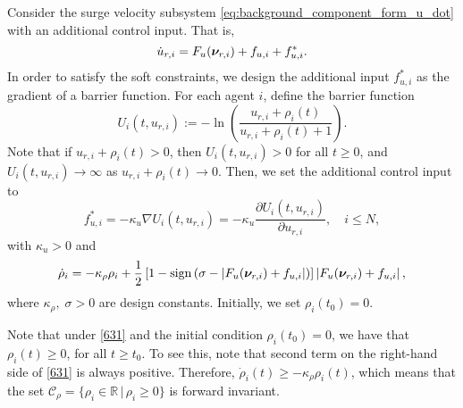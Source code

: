 Consider the surge velocity subsystem \eqref{eq:background_component_form_u_dot} with an additional control input. That is,
\begin{equation}\label{622}
	\dot{u}_{r, i} = F_{u}(\bm{\nu}_{r, i}) + f_{u, i} + f_{u, i}^*.
\end{equation}
In order to satisfy the soft constraints, we design the additional input $f_{u, i}^*$ as the gradient of a barrier function.
For each agent $i$, define the barrier function 
\begin{equation}\label{628}
	U_i(t,u_{r, i}):=-\ln\left(\frac{u_{r, i} + \rho_i(t)}{u_{r, i} + \rho_i(t) +1}\right).
\end{equation}
Note that if $u_{r, i} + \rho_i(t)>0$, then $U_i(t,u_{r, i})>0$ for all $t\geq0$, and $U_i(t,u_{r, i})\rightarrow\infty$ as $u_{r, i} + \rho_i(t)\rightarrow0$.
Then, we set the additional control input to
\begin{equation}\label{630}
 f_{u, i}^*= -\kappa_u\nabla U_i(t,u_{r, i}) = -\kappa_u\frac{\partial U_i(t,u_{r, i})}{\partial u_{r, i}}, \quad i\leq N,
\end{equation}
with $\kappa_u>0$ and
\begin{equation}\label{631}
\dot{\rho}_i= -\kappa_\rho \rho_i + \frac{1}{2}\left[1-{\rm sign}\left(\sigma-\left|F_{u}(\bm{\nu}_{r, i})+f_{u, i}\right|\right)\right]\left|F_{u}(\bm{\nu}_{r, i})+f_{u, i}\right|,
\end{equation}
where $\kappa_\rho,\;\sigma>0$ are design constants.
Initially, we set $\rho_i(t_0)=0$.

\begin{rmk}\label{rmk:rho}
	Note that under \eqref{631} and the initial condition $\rho_i(t_0)=0$, we have that $\rho_i(t)\geq 0$, for all $t\geq t_0$. To see this, note that second term on the right-hand side of \eqref{631} is always positive. Therefore, $\dot{\rho}_i(t)\geq -\kappa_\rho \rho_i(t)$, which means that the set $\mathcal{C}_\rho=\{\rho_i\in\mathbb{R}\, | \,\rho_i\geq 0\}$ is forward invariant.
\end{rmk}

